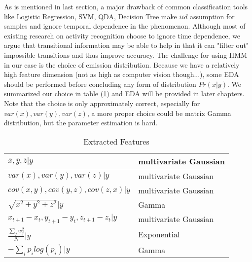 As is mentioned in last section, a major drawback of common classification tools like Logistic Regression, SVM, QDA, Decision Tree make $iid$ assumption for samples and ignore temporal dependence in the phenomenon. Although most of existing research on activity recognition choose to ignore time dependence, we argue that transitional information may be able to help in that it can "filter out" impossible transitions and thus improve accuracy. The challenge for using HMM in our case is the choice of emission distribution. Because we have a relatively high feature dimension (not as high as computer vision though...), some EDA should be performed before concluding any form of distribution $Pr(x|y)$. We summarized our choice in table (\ref{table:distribution}) and EDA will be provided in later chapters. Note that the choice is only approximately correct, especially for $var(x),var(y),var(z)$, a more proper choice could be matrix Gamma distribution, but the parameter estimation is hard. 
\begin{table}
\begin{center}
\begin{tabular}{|l|l|}
      \hline
      $\bar{x},\bar{y},\bar{z}|y$& multivariate Gaussian\\
      \hline
      $var(x),var(y),var(z)|y$ &  multivariate Gaussian\\
      \hline
      $cov(x,y),cov(y,z),cov(z,x)|y$& multivariate Gaussian\\
      \hline
      $\sqrt{x^2+y^2+z^2}|y$& Gamma\\
      \hline
      $x_{t+1}-x_{t},y_{t+1}-y_{t},z_{t+1}-z_{t}|y$ & multivariate Gaussian\\
      \hline
      $\frac{\sum_j w_j^2}{N}|y$& Exponential \\ \hline
      $ -\sum_i p_ilog(p_i)|y$ & Gamma \\
  \hline
\end{tabular}
\end{center}
\caption{Extracted Features}
\label{table:distribution}
\end{table}


